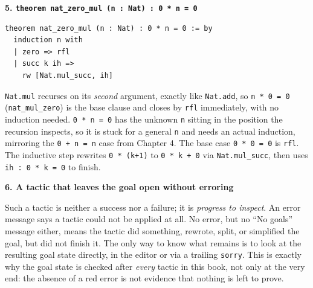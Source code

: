\textbf{5. \texttt{theorem nat\_\allowbreak{}zero\_\allowbreak{}mul (n : Nat) : 0 * n = 0}}

\begin{lstlisting}
theorem nat_zero_mul (n : Nat) : 0 * n = 0 := by
  induction n with
  | zero => rfl
  | succ k ih =>
    rw [Nat.mul_succ, ih]
\end{lstlisting}

\texttt{Nat.mul} recurses on its \emph{second} argument, exactly like \texttt{Nat.add}, so \texttt{n * 0 = 0} (\texttt{nat\_\allowbreak{}mul\_\allowbreak{}zero}) is the base clause and closes by \texttt{rfl} immediately, with no induction needed. \texttt{0 * n = 0} has the unknown \texttt{n} sitting in the position the recursion inspects, so it is stuck for a general \texttt{n} and needs an actual induction, mirroring the \texttt{0 + n = n} case from Chapter 4. The base case \texttt{0 * 0 = 0} is \texttt{rfl}. The inductive step rewrites \texttt{0 * (k+1)} to \texttt{0 * k + 0} via \texttt{Nat.mul\_\allowbreak{}succ}, then uses \texttt{ih : 0 * k = 0} to finish.

\textbf{6. A tactic that leaves the goal open without erroring}

Such a tactic is neither a success nor a failure; it is \emph{progress to inspect}. An error message says a tactic could not be applied at all. No error, but no ``No goals'' message either, means the tactic did something, rewrote, split, or simplified the goal, but did not finish it. The only way to know what remains is to look at the resulting goal state directly, in the editor or via a trailing \texttt{sorry}. This is exactly why the goal state is checked after \emph{every} tactic in this book, not only at the very end: the absence of a red error is not evidence that nothing is left to prove.

